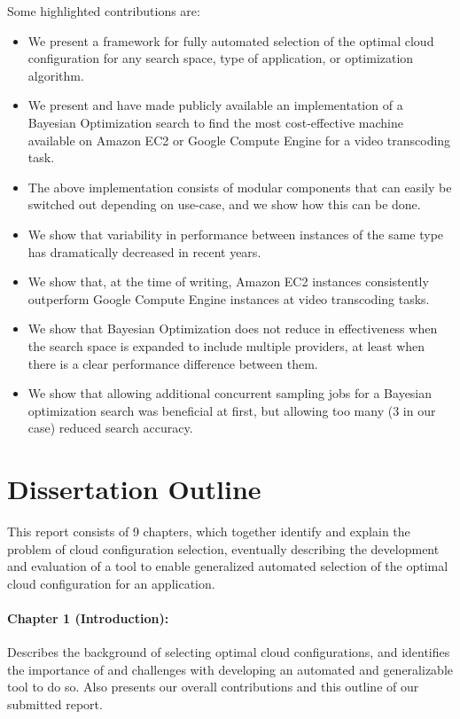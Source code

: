 \documentclass{report}
\begin{document}
Some highlighted contributions are:
\begin{itemize}
\item We present a framework for fully automated selection of the optimal cloud configuration for any search space, type of application, or optimization algorithm.
\item We present and have made publicly available an implementation of a Bayesian Optimization search to find the most cost-effective machine available on Amazon EC2 or Google Compute Engine for a video transcoding task.
\item The above implementation consists of modular components that can easily be switched out depending on use-case, and we show how this can be done.
\item We show that variability in performance between instances of the same type has dramatically decreased in recent years.
\item We show that, at the time of writing, Amazon EC2 instances consistently outperform Google Compute Engine instances at video transcoding tasks.
\item We show that Bayesian Optimization does not reduce in effectiveness when the search space is expanded to include multiple providers, at least when there is a clear performance difference between them.
\item We show that allowing additional concurrent sampling jobs for a Bayesian optimization search was beneficial at first, but allowing too many (3 in our case) reduced search accuracy.
\end{itemize}
 
\section{Dissertation Outline}
This report consists of 9 chapters, which together identify and explain the problem of cloud configuration selection, eventually describing the development and evaluation of a tool to enable generalized automated selection of the optimal cloud configuration for an application.

\paragraph{Chapter 1 (Introduction):} Describes the background of selecting optimal cloud configurations, and identifies the importance of and challenges with developing an automated and generalizable tool to do so. Also presents our overall contributions and this outline of our submitted report.
\end{document}

